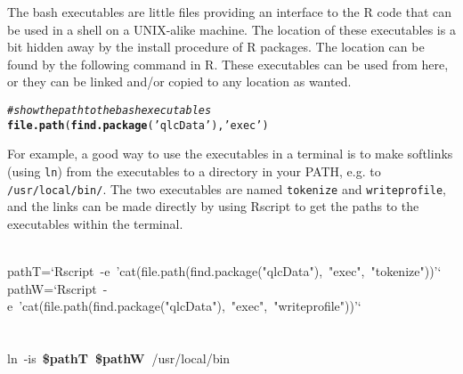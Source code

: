 \documentclass[output=inprep,
		biblatex
		]{LSP/langsci}\usepackage[]{graphicx}\usepackage[]{color}
\makeatletter
\newcommand{\hlstr}[1]{\textcolor[rgb]{0.192,0.494,0.8}{#1}}%
\newcommand{\hlcom}[1]{\textcolor[rgb]{0.678,0.584,0.686}{\textit{#1}}}%
\newcommand{\hlopt}[1]{\textcolor[rgb]{0,0,0}{#1}}%
\newcommand{\hlstd}[1]{\textcolor[rgb]{0.345,0.345,0.345}{#1}}%
\newcommand{\hlkwb}[1]{\textcolor[rgb]{0.69,0.353,0.396}{#1}}%
\newcommand{\hlkwc}[1]{\textcolor[rgb]{0.333,0.667,0.333}{#1}}%
\newcommand{\hlkwd}[1]{\textcolor[rgb]{0.737,0.353,0.396}{\textbf{#1}}}%
\newenvironment{kframe}{%
 \def\at@end@of@kframe{}%
 \ifinner\ifhmode%
  \def\at@end@of@kframe{\end{minipage}}%
  \begin{minipage}{\columnwidth}%
 \fi\fi%
 \def\FrameCommand##1{\hskip\@totalleftmargin \hskip-\fboxsep
 \colorbox{shadecolor}{##1}\hskip-\fboxsep
     \hskip-\linewidth \hskip-\@totalleftmargin \hskip\columnwidth}%
 \MakeFramed {\advance\hsize-\width
   \@totalleftmargin\z@ \linewidth\hsize
   \@setminipage}}%
 {\par\unskip\endMakeFramed%
 \at@end@of@kframe}
\newenvironment{knitrout}{}{} %
\makeatother
\begin{document}
The bash executables are little files providing an interface to the R code that
can be used in a shell on a UNIX-alike machine. The location of these
executables is a bit hidden away by the install procedure of R packages. The
location can be found by the following command in R. These executables can be 
used from here, or they can be linked and/or copied to any location as wanted.

\begin{knitrout}\footnotesize
{}\color{fgcolor}\begin{kframe}
\begin{alltt}
\hlcom{# show the path to the bash executables}
\hlkwd{file.path}\hlstd{(}\hlkwd{find.package}\hlstd{(}\hlstr{'qlcData'}\hlstd{),} \hlstr{'exec'}\hlstd{)}
\end{alltt}
\end{kframe}
\end{knitrout}

For example, a good way to use the executables in a terminal is to
make softlinks (using \texttt{ln}) from the executables to a directory in your
PATH, e.g. to \texttt{/usr/local/bin/}. The two executables are named
\texttt{tokenize} and \texttt{writeprofile}, and the links can be made directly 
by using Rscript to get the paths to the executables within the terminal.

\begin{knitrout}\scriptsize
{}\color{fgcolor}\begin{kframe}
\noindent
\ttfamily
\hlstd{}\hspace*{\fill}\\
\hlstd{pathT}\hlopt{=}\hlstd{}\hlstr{`Rscript\ {-}e\ 'cat(file.path(find.package("qlcData"),\ "exec",\ "tokenize"))'`}\hlstd{}\hspace*{\fill}\\
\hlstd{pathW}\hlopt{=}\hlstd{}\hlstr{`Rscript\ {-}e\ 'cat(file.path(find.package("qlcData"),\ "exec",\ "writeprofile"))'`}\hlstd{}\hspace*{\fill}\\
\hlstd{}\hspace*{\fill}\\
\hlstd{}\hspace*{\fill}\\
\hlstd{}\hlkwc{ln\ }\hlstd{}\hlkwb{{-}is\ }\hlstd{}\hlkwd{\$pathT\ \$pathW\ }\hlstd{}\hlopt{/}\hlstd{usr}\hlopt{/}\hlstd{local}\hlopt{/}\hlstd{bin}\hspace*{\fill}
\mbox{}
\normalfont
\end{kframe}
\end{knitrout}
\end{document}
